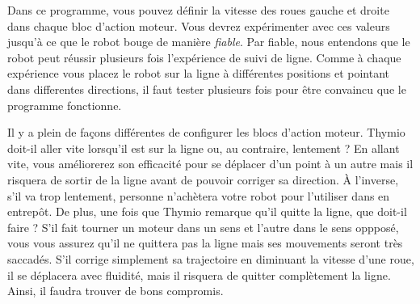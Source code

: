 Dans ce programme, vous pouvez définir la vitesse des roues gauche et droite dans chaque bloc d'action moteur.
Vous devrez expérimenter avec ces valeurs jusqu'à ce que le robot bouge de manière \emph{fiable}.
Par fiable, nous entendons que le robot peut réussir plusieurs fois l'expérience de suivi de ligne.
Comme à chaque expérience vous placez le robot sur la ligne à différentes positions et pointant dans differentes directions, il faut tester plusieurs fois pour être convaincu que le programme fonctionne.

Il y a plein de façons différentes de configurer les blocs d'action moteur.
Thymio doit-il aller vite lorsqu'il est sur la ligne ou, au contraire, lentement ?
En allant vite, vous améliorerez son efficacité pour se déplacer d'un point à un autre mais il risquera de sortir de la ligne avant de pouvoir corriger sa direction.
À l'inverse, s'il va trop lentement, personne n'achètera votre robot pour l'utiliser dans en entrepôt.
De plus, une fois que Thymio remarque qu'il quitte la ligne, que doit-il faire ?
S'il fait tourner un moteur dans un sens et l'autre dans le sens oppposé, vous vous assurez qu'il ne quittera pas la ligne mais ses mouvements seront très saccadés.
S'il corrige simplement sa trajectoire en diminuant la vitesse d'une roue, il se déplacera avec fluidité, mais il risquera de quitter complètement la ligne.
Ainsi, il faudra trouver de bons compromis.




